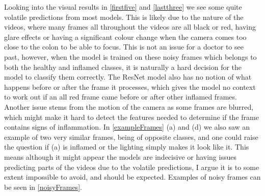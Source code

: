 Looking into the visual results in \autoref{firstfive} and \autoref{lastthree} we see some quite volatile predictions from most models. This is likely due to the nature of the videos, where many frames all throughout the videos are all black or red, having glare effects or having a significant colour change when the camera comes too close to the colon to be able to focus. This is not an issue for a doctor to see past, however, when the model is trained on these noisy frames which belongs to both the healthy and inflamed classes, it is naturally a hard decision for the model to classify them correctly. The ResNet model also has no notion of what happens before or after the frame it processes, which gives the model no context to work out if an all red frame came before or after other inflamed frames. Another issue stems from the motion of the camera as some frames are blurred, which might make it hard to detect the features needed to determine if the frame contains signs of inflammation. In \autoref{exampleFrames} (a) and (d) we also saw an example of two very similar frames, being of opposite classes, and one could raise the question if (a) is inflamed or the lighting simply makes it look like it. This means although it might appear the models are indecisive or having issues predicting parts of the videos due to the volatile predictions, I argue it is to some extent impossible to avoid, and should be expected. Examples of noisy frames can be seen in \autoref{noisyFrames}.

